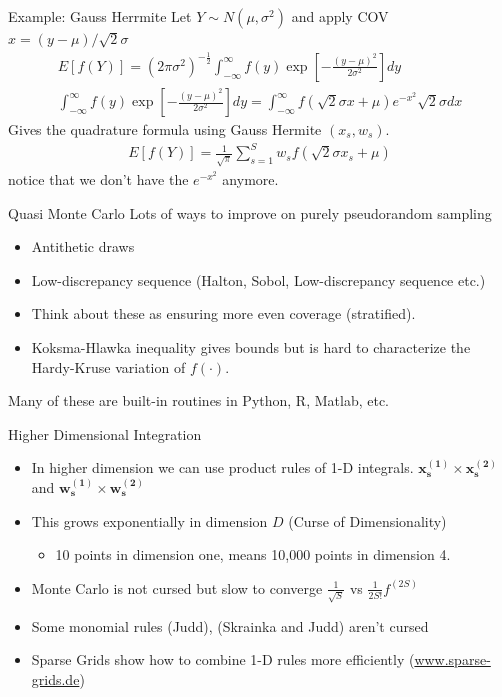 \documentclass[xcolor=pdftex,dvipsnames,table,mathserif,aspectratio=169]{beamer}
\begin{document}
\begin{frame}{Example: Gauss Herrmite}
Let $Y\sim N(\mu,\sigma^2)$ and apply COV $x = (y-\mu)/\sqrt{2} \sigma$
\begin{eqnarray*}
E[f(Y)] = (2 \pi \sigma^2)^{-\frac{1}{2}} \int_{-\infty}^{\infty} f(y) \exp\left[-\frac{(y-\mu)^2}{2\sigma^2} \right] dy \\
\int_{-\infty}^{\infty} f(y) \exp\left[-\frac{(y-\mu)^2}{2\sigma^2} \right] dy = \int_{-\infty}^{\infty} f(\sqrt{2} \sigma x + \mu) e^{-x^2} \sqrt{2} \sigma dx
\end{eqnarray*}
Gives the quadrature formula using Gauss Hermite $(x_s,w_s)$.
\begin{eqnarray*}
E[f(Y)] = \frac{1}{\sqrt{\pi}} \sum_{s=1}^S w_s f(\sqrt{2}\sigma x_s+ \mu)
\end{eqnarray*}
notice that we don't have the $e^{-x^2}$ anymore.
\end{frame}



\begin{frame}{Quasi Monte Carlo}
Lots of ways to improve on purely pseudorandom sampling
\begin{itemize}
\item Antithetic draws
\item Low-discrepancy sequence (Halton, Sobol, Low-discrepancy sequence etc.) 
\item Think about these as ensuring more even coverage (stratified).
\item Koksma-Hlawka inequality gives bounds but is hard to characterize the Hardy-Kruse variation of $f(\cdot)$.
\end{itemize}
Many of these are built-in routines in Python, R, Matlab, etc.
\end{frame}







\begin{frame}{Higher Dimensional Integration}
\begin{itemize}
\item In higher dimension we can use product rules of 1-D integrals. $\mathbf{x_s^{(1)}} \times \mathbf{x_s^{(2)}}$ and $\mathbf{w_s^{(1)}} \times \mathbf{w_s^{(2)}}$
\item This grows exponentially in dimension $D$ (Curse of Dimensionality)
\begin{itemize}
\item 10 points in dimension one, means 10{,}000 points in dimension 4.
\end{itemize}

\item Monte Carlo is not cursed but slow to converge $\frac{1}{\sqrt{S}}$ vs $\frac{1}{2S!} f^{(2S)}$
\item Some monomial rules (Judd), (Skrainka and Judd) aren't cursed
\item Sparse Grids show how to combine 1-D rules more efficiently (\url{www.sparse-grids.de})
\end{itemize}
\end{frame}
\end{document}
